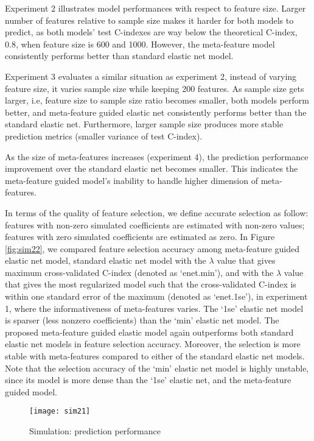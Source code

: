 Experiment 2 illustrates model performances with respect to feature size. Larger number of features relative to sample size makes it harder for both models to predict, as both models' test C-indexes are way below the theoretical C-index, 0.8, when feature size is 600 and 1000. However, the meta-feature model consistently performs better than standard elastic net model.

Experiment 3 evaluates a similar situation as experiment 2, instead of varying feature size, it varies sample size while keeping 200 features. As sample size gets larger, i.e, feature size to sample size ratio becomes smaller, both models perform better, and meta-feature guided elastic net consistently performs better than the standard elastic net. Furthermore, larger sample size produces more stable prediction metrics (smaller variance of test C-index). 

As the size of meta-features increases (experiment 4), the prediction performance improvement over the standard elastic net becomes smaller. This indicates the meta-feature guided model's inability to handle higher dimension of meta-features.  

In terms of the quality of feature selection, we define accurate selection as follow: features with non-zero simulated coefficients are estimated with non-zero values; features with zero simulated coefficients are estimated as zero. In Figure \ref{fig:sim22}, we compared feature selection accuracy among meta-feature guided elastic net model, standard elastic net model with the $\lambda$ value that gives maximum cross-validated C-index (denoted as `enet.min'), and with the $\lambda$ value that gives the most regularized model such that the cross-validated C-index is within one standard error of the maximum (denoted as `enet.1se'), in experiment 1, where the informativeness of meta-features varies. The `1se' elastic net model is sparser (less nonzero coefficients) than the `min' elastic net model. The proposed meta-feature guided elastic model again outperforms both standard elastic net models in feature selection accuracy. Moreover, the selection is more stable with meta-features compared to either of the standard elastic net models. Note that the selection accuracy of the `min' elastic net model is highly unstable, since its model is more dense than the `1se' elastic net, and the meta-feature guided model.
\begin{figure}
    \texttt{[image: sim21]}
    \caption{Simulation: prediction performance }
    \label{fig:sim21}
\end{figure} 

